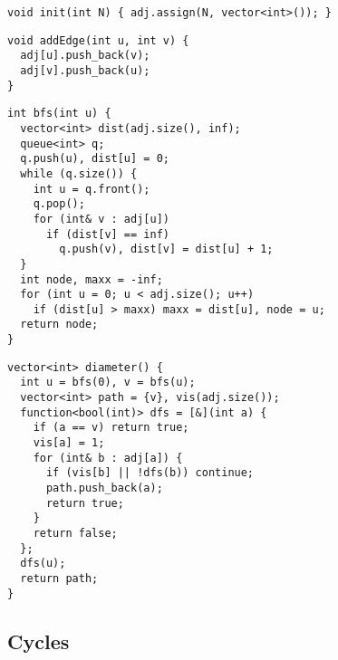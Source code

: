 \documentclass[twoside]{article}
\newcommand{\fileTitleStyle}{\large\underline}
\begin{document}
\begin{multicols*}{2}
\begin{verbatim}
void init(int N) { adj.assign(N, vector<int>()); }
\end{verbatim}
\vspace{-12pt}
\begin{verbatim}
void addEdge(int u, int v) {
  adj[u].push_back(v);
  adj[v].push_back(u);
}
\end{verbatim}
\vspace{-12pt}
\begin{verbatim}
int bfs(int u) {
  vector<int> dist(adj.size(), inf);
  queue<int> q;
  q.push(u), dist[u] = 0;
  while (q.size()) {
    int u = q.front();
    q.pop();
    for (int& v : adj[u])
      if (dist[v] == inf)
        q.push(v), dist[v] = dist[u] + 1;
  }
  int node, maxx = -inf;
  for (int u = 0; u < adj.size(); u++)
    if (dist[u] > maxx) maxx = dist[u], node = u;
  return node;
}
\end{verbatim}
\vspace{-12pt}
\begin{verbatim}
vector<int> diameter() {
  int u = bfs(0), v = bfs(u);
  vector<int> path = {v}, vis(adj.size());
  function<bool(int)> dfs = [&](int a) {
    if (a == v) return true;
    vis[a] = 1;
    for (int& b : adj[a]) {
      if (vis[b] || !dfs(b)) continue;
      path.push_back(a);
      return true;
    }
    return false;
  };
  dfs(u);
  return path;
}
\end{verbatim}

\subsectionfont{\centering\bfseries\LARGE}
\vspace{0em}
\subsection*{Cycles}
\vspace{2em}
\subsubsectionfont{\centering\bfseries\Large}
\subsubsectionfont{\fileTitleStyle}

\end{multicols*}
\end{document}
